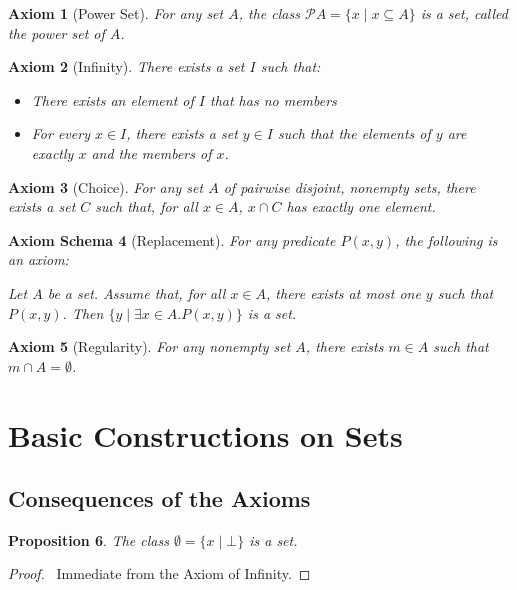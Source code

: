 \documentclass{book}
\let\qed\relax
\newtheorem{ax}{Axiom}[section]
\newtheorem{axs}[ax]{Axiom Schema}
\newtheorem{prop}[ax]{Proposition}
\theoremstyle{definition}
\begin{document}
\begin{ax}[Power Set]
For any set $A$, the class $\mathcal{P} A = \{x \mid x \subseteq A\}$ is a set, called the \emph{power set} of $A$.
\end{ax}

\begin{ax}[Infinity]
There exists a set $I$ such that:
\begin{itemize}
\item There exists an element of $I$ that has no members
\item For every $x \in I$, there exists a set $y \in I$ such that the elements of $y$ are exactly $x$ and the members of $x$.
\end{itemize}
\end{ax}

\begin{ax}[Choice]
For any set $A$ of pairwise disjoint, nonempty sets, there exists a set $C$ such that, for all $x \in A$, $x \cap C$ has exactly one element.
\end{ax}

\begin{axs}[Replacement]
For any predicate $P(x,y)$, the following is an axiom:

Let $A$ be a set. Assume that, for all $x \in A$, there exists at most one $y$ such that $P(x,y)$. Then $\{y \mid \exists x \in A. P(x,y)\}$ is a set.
\end{axs}

\begin{ax}[Regularity]
For any nonempty set $A$, there exists $m \in A$ such that $m \cap A = \emptyset$.
\end{ax}

\section{Basic Constructions on Sets}

\subsection{Consequences of the Axioms}

\begin{prop}
The class $\emptyset = \{x \mid \bot \}$ is a set.
\end{prop}

\begin{proof}
\pf\ Immediate from the Axiom of Infinity. \qed
\end{proof}
\end{document}
